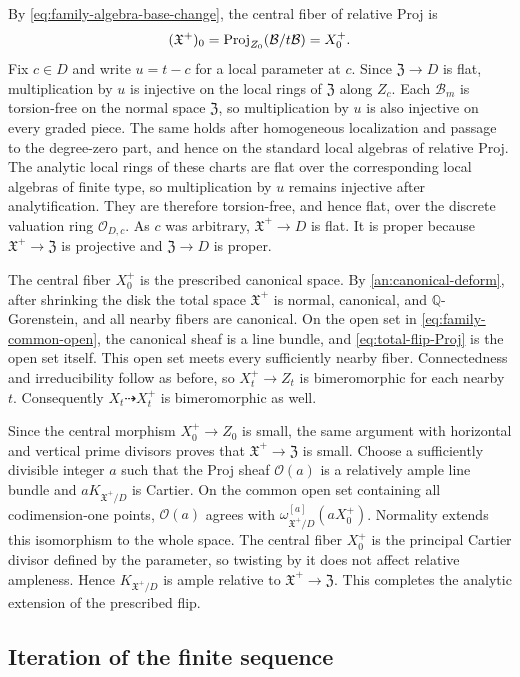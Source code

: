 \documentclass[11pt,a4paper]{article}
\theoremstyle{definition}\newtheorem{definition}[theorem]{Definition}
\theoremstyle{remark}\newtheorem*{remark}{Remark}
\newcommand{\Q}{\mathbb Q}\newcommand{\C}{\mathbb C}
\newcommand{\OO}{\mathcal O}
\begin{document}
By \eqref{eq:family-algebra-base-change}, the central fiber of
relative Proj is
\[
 (\mathfrak X^+)_0
 =\operatorname{Proj}_{Z_0}(\mathcal B/t\mathcal B)=X_0^+.
\]
Fix $c\in D$ and write $u=t-c$ for a local parameter at $c$.
Since $\mathfrak Z\to D$ is flat, multiplication by $u$ is
injective on the local rings of $\mathfrak Z$ along $Z_c$.
Each $\mathcal B_m$ is torsion-free on the normal space
$\mathfrak Z$, so multiplication by $u$ is also injective on
every graded piece. The same holds after homogeneous localization
and passage to the degree-zero part, and hence on the standard
local algebras of relative Proj. The analytic local rings of these
charts are flat over the corresponding local algebras of finite
type, so multiplication by $u$ remains injective after
analytification. They are therefore torsion-free, and hence flat,
over the discrete valuation ring $\OO_{D,c}$.
As $c$ was arbitrary, $\mathfrak X^+\to D$ is flat.
It is proper because $\mathfrak X^+\to\mathfrak Z$ is projective
and $\mathfrak Z\to D$ is proper.

The central fiber $X_0^+$ is the prescribed canonical space.
By \ref{an:canonical-deform}, after shrinking the disk the total
space $\mathfrak X^+$ is normal, canonical, and
$\Q$-Gorenstein, and all nearby fibers are canonical.
On the open set in \eqref{eq:family-common-open}, the canonical
sheaf is a line bundle, and \eqref{eq:total-flip-Proj} is the open
set itself. This open set meets every sufficiently nearby fiber.
Connectedness and irreducibility follow as before, so
$X_t^+\to Z_t$ is bimeromorphic for each nearby $t$.
Consequently $X_t\dashrightarrow X_t^+$ is bimeromorphic as well.

Since the central morphism $X_0^+\to Z_0$ is small, the same
argument with horizontal and vertical prime divisors proves that
$\mathfrak X^+\to\mathfrak Z$ is small. Choose a sufficiently
divisible integer $a$ such that the Proj sheaf $\OO(a)$ is a
relatively ample line bundle and
$aK_{\mathfrak X^+/D}$ is Cartier. On the common open set
containing all codimension-one points, $\OO(a)$ agrees with
$\omega_{\mathfrak X^+/D}^{[a]}(aX_0^+)$. Normality extends
this isomorphism to the whole space. The central fiber $X_0^+$
is the principal Cartier divisor defined by the parameter, so
twisting by it does not affect relative ampleness. Hence
$K_{\mathfrak X^+/D}$ is ample relative to
$\mathfrak X^+\to\mathfrak Z$. This completes the analytic
extension of the prescribed flip.

\subsection{Iteration of the finite sequence}
\end{document}
